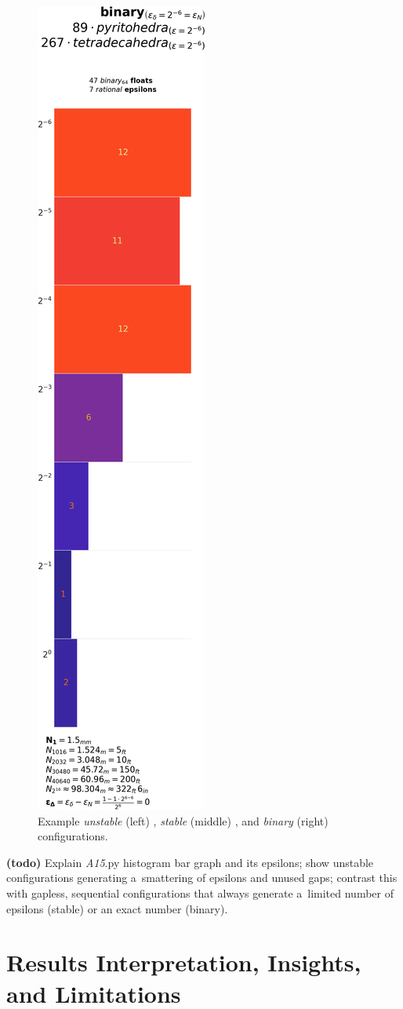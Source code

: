 \documentclass[10pt]{article}
\def\AAAB{\textit{A15}}
\begin{document}
\begin{figure}[!hb]
\includegraphics[width=.26\textwidth]{histb} \caption{ Example \emph{unstable} (left) \label{fig-histu}, \emph{stable}
(middle) \label{fig-hists}, and \emph{binary} (right) \label{fig-histb} configurations. } \end{figure}

\textbf{(todo)} Explain \AAAB.py histogram bar graph and its epsilons; show unstable configurations generating a~smattering of
epsilons and unused gaps; contrast this with gapless, sequential configurations that always generate a~limited number of epsilons
(stable) or an exact number (binary).


\section{ Results Interpretation, Insights, and Limitations }\label{results-interpretation-insights-and-limitations}
\end{document}

